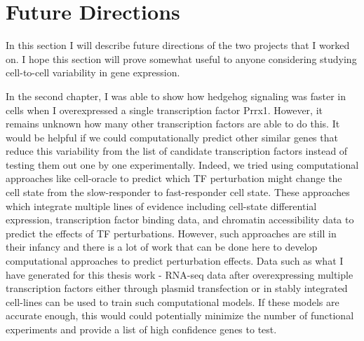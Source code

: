 \section{Future Directions}

In this section I will describe future directions of the two projects that I worked on. I hope this section will prove somewhat useful to anyone considering studying cell-to-cell variability in gene expression. 

In the second chapter, I was able to show how hedgehog signaling was faster in cells when I overexpressed a single transcription factor Prrx1. However, it remains unknown how many other transcription factors are able to do this. It would be helpful if we could computationally predict other similar genes that reduce this variability from the list of candidate transcription factors instead of testing them out one by one experimentally. Indeed, we tried using computational approaches like cell-oracle \cite{kamimoto2020} to predict which TF perturbation might change the cell state from the slow-responder to fast-responder cell state. These approaches which integrate multiple lines of evidence including cell-state differential expression, transcription factor binding data, and chromatin accessibility data to predict the effects of TF perturbations. However, such approaches are still in their infancy and there is a lot of work that can be done here to develop computational approaches to predict perturbation effects. Data such as what I have generated for this thesis work - RNA-seq data after overexpressing multiple transcription factors either through plasmid transfection or in stably integrated cell-lines can be used to train such computational models. If these models are accurate enough, this would could potentially minimize the number of functional experiments and provide a list of high confidence genes to test.


